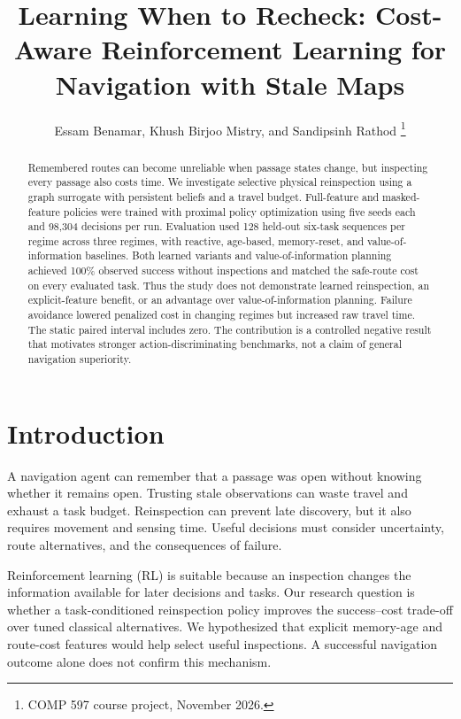 \documentclass[journal]{IEEEtai}
\begin{document}
\title{Learning When to Recheck: Cost-Aware Reinforcement Learning for Navigation with Stale Maps}
\author{Essam Benamar, Khush Birjoo Mistry, and Sandipsinh Rathod%
\thanks{COMP 597 course project, November 2026.}}
\maketitle

\begin{abstract}
Remembered routes can become unreliable when passage states change, but inspecting every passage also costs time. We investigate selective physical reinspection using a graph surrogate with persistent beliefs and a travel budget. Full-feature and masked-feature policies were trained with proximal policy optimization using five seeds each and 98,304 decisions per run. Evaluation used 128 held-out six-task sequences per regime across three regimes, with reactive, age-based, memory-reset, and value-of-information baselines. Both learned variants and value-of-information planning achieved 100\% observed success without inspections and matched the safe-route cost on every evaluated task. Thus the study does not demonstrate learned reinspection, an explicit-feature benefit, or an advantage over value-of-information planning. Failure avoidance lowered penalized cost in changing regimes but increased raw travel time. The static paired interval includes zero. The contribution is a controlled negative result that motivates stronger action-discriminating benchmarks, not a claim of general navigation superiority.
\end{abstract}

\section{Introduction}
A navigation agent can remember that a passage was open without knowing whether it remains open. Trusting stale observations can waste travel and exhaust a task budget. Reinspection can prevent late discovery, but it also requires movement and sensing time. Useful decisions must consider uncertainty, route alternatives, and the consequences of failure.

Reinforcement learning (RL) is suitable because an inspection changes the information available for later decisions and tasks. Our research question is whether a task-conditioned reinspection policy improves the success--cost trade-off over tuned classical alternatives. We hypothesized that explicit memory-age and route-cost features would help select useful inspections. A successful navigation outcome alone does not confirm this mechanism.
\end{document}
